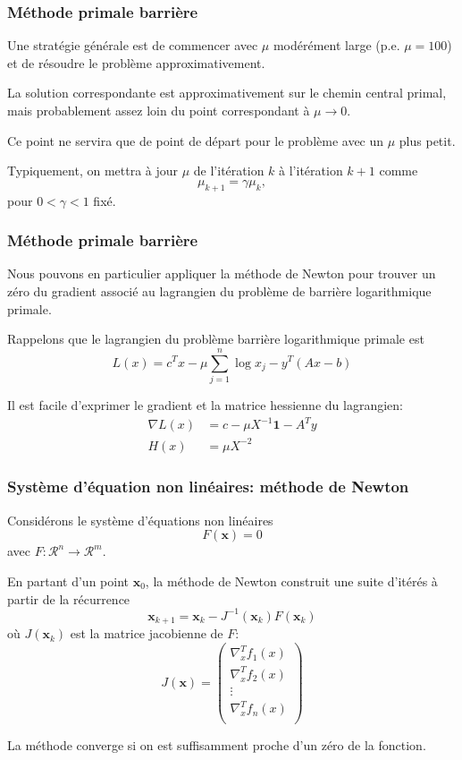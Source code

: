 \documentclass[usepdftitle=false, aspectratio=169]{beamer}
\def\bx{\boldsymbol{x}}
\def\bone{\boldsymbol{1}}
\def\RR{\mathcal{R}}
\begin{document}
\begin{frame}
\frametitle{Méthode primale barrière}

Une stratégie générale est de commencer avec $\mu$ modérément large (p.e. $\mu = 100$) et de résoudre le problème approximativement.

\mbox{}

La solution correspondante est approximativement sur le chemin central primal, mais probablement assez loin du point correspondant à $\mu \rightarrow 0$.

\mbox{}

Ce point ne servira que de point de départ pour le problème avec un $\mu$ plus petit.

\mbox{}

Typiquement, on mettra à jour $\mu$ de l'itération $k$ à l'itération $k+1$ comme
\[
\mu_{k+1} = \gamma \mu_k,
\]
pour $0< \gamma < 1$ fixé.

\end{frame}

\begin{frame}
\frametitle{Méthode primale barrière}

Nous pouvons en particulier appliquer la méthode de Newton pour trouver un zéro du gradient associé au lagrangien du problème de barrière logarithmique primale.

\mbox{}

Rappelons que le lagrangien du problème barrière logarithmique primale est
$$
L(x) = c^Tx - \mu \sum_{j = 1}^n \log x_j - y^T(Ax-b)
$$

\mbox{}

Il est facile d'exprimer le gradient et la matrice hessienne du lagrangien:
\begin{align*}
\nabla L(x) &= c-\mu X^{-1}\bone - A^Ty \\
H(x) & = \mu X^{-2}
\end{align*}

\end{frame}

\begin{frame}
	\frametitle{Système d'équation non linéaires: méthode de Newton}
	
	Considérons le système d'équations non linéaires
	$$
	F(\bx) = 0
	$$
	avec $F: \RR^n \rightarrow \RR^m$.
	
	\mbox{}
	
	En partant d'un point $\bx_0$, la méthode de Newton construit une suite d'itérés à partir de la récurrence
	$$
	\bx_{k+1} = \bx_k - J^{-1}(\bx_k) F(\bx_k)
	$$
	où $J(\bx_k)$ est la matrice jacobienne de $F$:
	\[
	J(\bx) =
	\begin{pmatrix}
		\nabla^T_x f_1(x) \\
		\nabla^T_x f_2(x) \\
		\vdots \\
		\nabla^T_x f_n(x) \\
	\end{pmatrix}
	\]
	
	La méthode converge si on est suffisamment proche d'un zéro de la fonction.
	
\end{frame}
\end{document}
